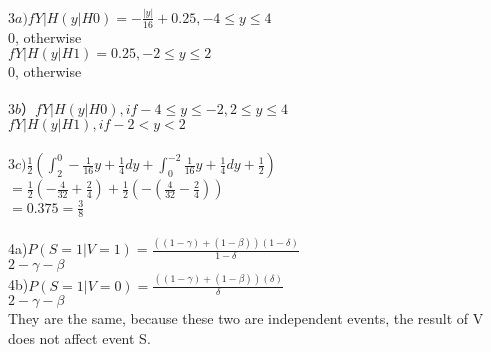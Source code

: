 \documentclass[11pt]{article}
\begin{document}
\paragraph{}
$3a) fY|H(y|H0) = -\frac{|y|}{16} + 0.25, -4\leq y \leq 4$\\
                         0, otherwise\\
$fY|H(y|H1) = 0.25, -2 \leq y \leq 2$\\
                        0, otherwise\\
\\
$3b） fY|H(y|H0), if -4 \leq y \leq -2, 2 \leq y \leq 4$\\
$fY|H(y|H1), if -2 < y <2$\\ 
\\
$3c)  \frac{1}{2}(\int_{2}^{0} -\frac{1}{16}y + \frac{1}{4}dy + \int_{0}^{-2}\frac{1}{16}y+\frac{1}{4}dy + \frac{1}{2})$\\
$= \frac{1}{2}(-\frac{4}{32} + \frac{2}{4}) + \frac{1}{2}(-(\frac{4}{32}-\frac{2}{4}))$\\
$=0.375 = \frac{3}{8}$

\paragraph{}
4a)$P(S = 1|V = 1) = \frac{((1 - \gamma) + (1 - \beta))(1-\delta)}{1-\delta}$\\
${2 - \gamma - \beta}$\\
4b)$P(S = 1|V = 0) = \frac{((1 - \gamma) + (1 - \beta))(\delta)}{\delta}$\\
$2 - \gamma - \beta$\\
They are the same, because these two are independent events, the result of V does not affect event S.
%
%
%
%
%
%
%
%
%
%
%
%
%
%
%
%
%
%




\label{EndOfAssignment}%
\end{document}
